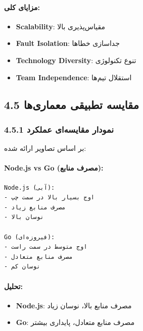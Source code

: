 \documentclass[
]{article}
\providecommand{\tightlist}{%
  \setlength{\itemsep}{0pt}\setlength{\parskip}{0pt}}
\begin{document}
\paragraph{مزایای
کلی:}\label{ux645ux632ux627ux6ccux627ux6cc-ux6a9ux644ux6cc}

\begin{itemize}
\tightlist
\item
  \textbf{Scalability}: مقیاس‌پذیری بالا
\item
  \textbf{Fault Isolation}: جداسازی خطاها
\item
  \textbf{Technology Diversity}: تنوع تکنولوژی
\item
  \textbf{Team Independence}: استقلال تیم‌ها
\end{itemize}

\subsection{4.5 مقایسه تطبیقی
معماری‌ها}\label{ux645ux642ux627ux6ccux633ux647-ux62aux637ux628ux6ccux642ux6cc-ux645ux639ux645ux627ux631ux6ccux647ux627}

\subsubsection{4.5.1 نمودار مقایسه‌ای
عملکرد}\label{ux646ux645ux648ux62fux627ux631-ux645ux642ux627ux6ccux633ux647ux627ux6cc-ux639ux645ux644ux6a9ux631ux62f}

بر اساس تصاویر ارائه شده:

\paragraph{Node.js vs Go (مصرف
منابع):}\label{node.js-vs-go-ux645ux635ux631ux641-ux645ux646ux627ux628ux639}

\begin{verbatim}
Node.js (آبی):
- اوج بسیار بالا در سمت چپ
- مصرف منابع زیاد
- نوسان بالا

Go (فیروزه‌ای):
- اوج متوسط در سمت راست
- مصرف منابع متعادل
- نوسان کم
\end{verbatim}

\paragraph{تحلیل:}\label{ux62aux62dux644ux6ccux644-6}

\begin{itemize}
\tightlist
\item
  \textbf{Node.js}: مصرف منابع بالا، نوسان زیاد
\item
  \textbf{Go}: مصرف منابع متعادل، پایداری بیشتر
\end{itemize}
\end{document}
